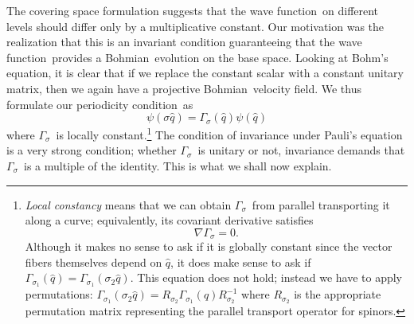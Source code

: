\documentclass[11pt]{article}
\theoremstyle{remark}
\begin{document}
The covering space formulation suggests that the wave function\ on different levels
should differ only by a multiplicative constant. Our motivation was
the realization that this is an invariant condition guaranteeing that
the wave function\ provides a Bohmian\ evolution on the base space. Looking at
Bohm's equation, it is clear that if we replace the constant scalar with a
constant unitary matrix, then we again have a projective Bohmian\
velocity field.  We thus formulate our
periodicity condition\ as  
\begin{equation} \label{e:ansatz}
\ensuremath{\psi}(\ensuremath{\sigma} \ensuremath{\hat{q}}) = \ensuremath{\Gamma_{\ensuremath{\sigma}}}(\ensuremath{\hat{q}}) \ensuremath{\psi}(\ensuremath{\hat{q}})
\end{equation}
where \ensuremath{\Gamma_{\ensuremath{\sigma}}}\ is locally constant.\footnote{
\emph{Local constancy} means that we can obtain \ensuremath{\Gamma_{\ensuremath{\sigma}}}\ from parallel
transporting it along a curve; equivalently, its covariant derivative
satisfies 
\begin{equation*}
\nabla \ensuremath{\Gamma_{\ensuremath{\sigma}}} = 0.
\end{equation*}
Although it makes no sense to ask if it is globally constant since
the vector fibers themselves depend on \ensuremath{\hat{q}}, it does make sense to
ask if $\ensuremath{\Gamma_{\ensuremath{\ensuremath{\sigma}_{1}}}} (\ensuremath{\hat{q}}) = \ensuremath{\Gamma_{\ensuremath{\ensuremath{\sigma}_{1}}}} (\ensuremath{\ensuremath{\sigma}_{2}}
\ensuremath{\hat{q}})$. This equation does not hold; instead we have to apply
permutations:  $\ensuremath{\Gamma_{\ensuremath{\ensuremath{\sigma}_{1}}}} (\ensuremath{\ensuremath{\sigma}_{2}} \ensuremath{\hat{q}}) = R_{\ensuremath{\ensuremath{\sigma}_{2}}} \ensuremath{\Gamma_{\ensuremath{\ensuremath{\sigma}_{1}}}} (
\ensuremath{\hat{q}}) R_{\ensuremath{\ensuremath{\sigma}_{2}}}^{-1}$ where $R_{\ensuremath{\ensuremath{\sigma}_{2}}}$ is the appropriate
permutation matrix representing the parallel transport operator for
spinors. 
}
The 
condition of invariance under
Pauli's equation is a very strong condition; whether \ensuremath{\Gamma_{\ensuremath{\sigma}}}\ is
unitary or not, invariance demands that \ensuremath{\Gamma_{\ensuremath{\sigma}}}\ is a multiple of the
identity. This is what we shall now explain. 
\end{document}
